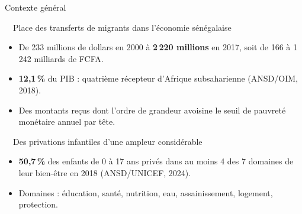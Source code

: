 \documentclass[10pt,aspectratio=169]{beamer}
\newcommand{\ombretexte}[1]{%
  \leavevmode\rlap{\kern0.7pt\raisebox{-0.7pt}{\color{black!55}#1}}#1}
\newcommand{\chiffre}[1]{{\bfseries\large\ombretexte{#1}}}
\begin{document}
\begin{frame}{Contexte général}
  \small
  \noindent\begin{minipage}{0.88\textwidth}
    \begin{block}{{\color{presorange}\faHandHoldingUsd}~~Place des transferts de migrants dans l'économie sénégalaise}
      \begin{itemize}
        \setlength{\itemsep}{1pt}
        \item De 233 millions de dollars en 2000 à \chiffre{2\,220 millions} en 2017, soit de 166 à 1\,242 milliards de FCFA.
        \item \chiffre{12,1\,\%} du PIB : quatrième récepteur d'Afrique subsaharienne (ANSD/OIM, 2018).
        \item Des montants reçus dont l'ordre de grandeur avoisine le seuil de pauvreté monétaire annuel par tête.
      \end{itemize}
    \end{block}
  \end{minipage}

  \noindent{}%
  \hspace*{0.12\textwidth}\begin{minipage}{0.88\textwidth}
    \begin{alertblock}{{\color{presorange}\faChild}~~Des privations infantiles d'une ampleur considérable}
      \begin{itemize}
        \setlength{\itemsep}{1pt}
        \item \chiffre{50,7\,\%} des enfants de 0 à 17 ans privés dans au moins 4 des 7 domaines de leur bien-être en 2018 (ANSD/UNICEF, 2024).
        \item Domaines : éducation, santé, nutrition, eau, assainissement, logement, protection.
      \end{itemize}
    \end{alertblock}
  \end{minipage}
\end{frame}
\end{document}
